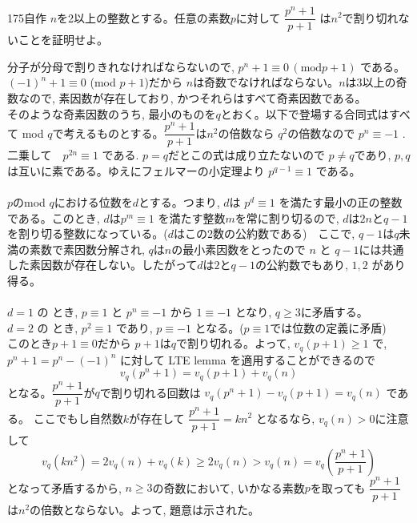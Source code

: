 \begin{thm}{175}{}{自作}
 $n$を2以上の整数とする。任意の素数$p$に対して $\dfrac{p^n+1}{p+1}$ は$n^2$で割り切れないことを証明せよ。
\end{thm}

分子が分母で割りきれなければならないので, $p^n+1\equiv 0 \, (\mbox{mod} p+1)$ である。$(-1)^n+1\equiv 0$ (mod  $p+1$)だから $n$は奇数でなければならない。$n$は3以上の奇数なので, 素因数が存在しており, かつそれらはすべて奇素因数である。\\
そのような奇素因数のうち, 最小のものを$q$とおく。以下で登場する合同式はすべて mod $q$で考えるものとする。$\dfrac{p^n+1}{p+1}$は$n^2$の倍数なら $q^2$の倍数なので $p^n\equiv -1$ . 二乗して　$p^{2n}\equiv 1$  である. $p=q$だとこの式は成り立たないので $p\neq q$であり, $p,q$は互いに素である。ゆえにフェルマーの小定理より $p^{q-1}\equiv 1$ である。\\
\\
$p$のmod $q$における位数を$d$とする。つまり, $d$は $p^d\equiv 1$ を満たす最小の正の整数である。このとき, $d$は$p^m\equiv 1$  を満たす整数$m$を常に割り切るので, $d$は$2n$と$q-1$ を割り切る整数になっている。($d$はこの2数の公約数である)　ここで, $q-1$は$q$未満の素数で素因数分解され, $q$は$n$の最小素因数をとったので $n$ と $q-1$には共通した素因数が存在しない。したがって$d$は$2$と$q-1$の公約数でもあり, $1,2$ があり得る。\\
\\
$d=1$ の とき, $p\equiv 1$ と $p^n\equiv -1$ から $1\equiv -1$ となり, $q\geq 3$に矛盾する。\\
$d=2$ の とき, $p^2\equiv 1$ であり,  $p\equiv -1$ となる。($p\equiv 1$では位数の定義に矛盾)\\
このとき$p+1\equiv 0$だから $p+1$は$q$で割り切れる。よって, $v_{q}(p+1)\geq 1$ で, $p^n+1=p^n-(-1)^n$ に対して LTE lemma を適用することができるので
\[v_q(p^n+1)=v_q(p+1)+v_q(n)\]
となる。$\dfrac{p^n+1}{p+1}$が$q$で割り切れる回数は $v_q{(p^n+1)}-v_q(p+1)=v_q(n)$ である。 ここでもし自然数$k$が存在して $\dfrac{p^n+1}{p+1}=kn^2$ となるなら, $v_q(n)>0$に注意して
\[v_q(kn^2)=2v_q(n)+v_q(k)\geq 2v_q(n)>v_q(n)=v_q\left(\dfrac{p^n+1}{p+1}\right)\]
となって矛盾するから, $n\geq 3$の奇数において, いかなる素数$p$を取っても $\dfrac{p^n+1}{p+1}$は$n^2$の倍数とならない。よって, 題意は示された。

